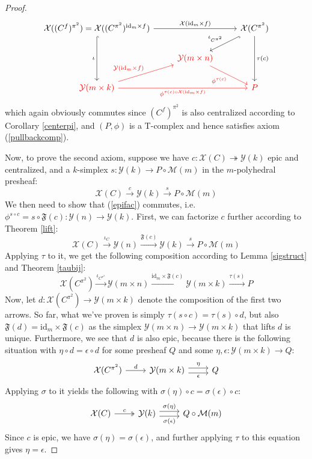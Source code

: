 \documentclass{article}
\theoremstyle{remark}
\theoremstyle{definition}
\newcommand{\id}{\mathrm{id}}
\newcommand{\Y}{\mathcal Y}
\newcommand{\X}{\mathcal X}
\newcommand{\F}{\mathfrak F}
\newcommand{\M}{\mathcal M}
\begin{document}
\begin{proof}
\[\begin{tikzcd}
			\X((C^f)^{\pi^2})=\X((C^{\pi^2})^{\id_m\times f})\arrow[hook]{dd}[swap]{\iota}\arrow{rr}{\X(\id_m\times f)}&&\X(C^{\pi^2})\arrow[hook]{ld}[swap]{\iota_{C^{\pi^2}}}\arrow{dd}{\tau(c)}\\
			&\color{red}{\Y(m\times n)}\arrow[color=red]{dr}[swap]{\phi^{\tau(c)}}\\
			\color{red}{\Y(m\times k)}\arrow[color=red]{ur}{\Y(\id_m\times f)}\arrow[color=red]{rr}[swap]{\phi^{\tau(c)\circ\X(\id_m\times f)}}&&\color{red}P
		\end{tikzcd}\]
		which again obviously commutes since $(C^f)^{\pi^2}$ is also centralized according to Corollary \ref{centerpi}, and $(P,\phi)$ is a T-complex and hence satisfies axiom (\ref{pullbackcomp}).
		
		Now, to prove the second axiom, suppose we have $c:\X(C)\twoheadrightarrow\Y(k)$ epic and centralized, and a $k$-simplex $s:\Y(k)\to P\circ\M(m)$ in the $m$-polyhedral presheaf:
		\[\X(C)\xrightarrow{c}\Y(k)\xrightarrow{s}P\circ\M(m)\]
		We then need to show that (\ref{epifac}) commutes, i.e. $\phi^{s\circ c}=s\circ\F(c):\Y(n)\to\Y(k)$. First, we can factorize $c$ further according to Theorem \ref{lift}:
		\[\X(C)\xrightarrow{\iota_C}\Y(n)\xrightarrow{\F(c)}\Y(k)\xrightarrow{s}P\circ\M(m)\]
		Applying $\tau$ to it, we get the following composition according to Lemma \ref{sigstruct} and Theorem \ref{taubij}:
		\[\X(C^{\pi^2})\xrightarrow{\iota_{C^{\pi^2}}}\Y(m\times n)\xrightarrow{\id_m\times\F(c)}\Y(m\times k)\xrightarrow{\tau(s)}P\]
		Now, let $d:\X(C^{\pi^2})\to\Y(m\times k)$ denote the composition of the first two arrows. So far, what we've proven is simply $\tau(s\circ c)=\tau(s)\circ d$, but also $\F(d)=\id_m\times\F(c)$ as the simplex $\Y(m\times n)\to\Y(m\times k)$ that lifts $d$ is unique. Furthermore, we see that $d$ is also epic, because there is the following situation with $\eta\circ d=\epsilon\circ d$ for some presheaf $Q$ and some $\eta,\epsilon:\Y(m\times k)\to Q$:
		\[\begin{tikzcd}
			\X(C^{\pi^2})\arrow{r}{d}&\Y(m\times k)\arrow[shift left=1mm]{r}{\eta}\arrow[shift right=1mm]{r}[swap]{\epsilon}&Q
		\end{tikzcd}\]
		Applying $\sigma$ to it yields the following with $\sigma(\eta)\circ c=\sigma(\epsilon)\circ c$:
		\[\begin{tikzcd}
			\X(C)\arrow[two heads]{r}{c}&\Y(k)\arrow[shift left=1mm]{r}{\sigma(\eta)}\arrow[shift right=1mm]{r}[swap]{\sigma(\epsilon)}&Q\circ\M(m)
		\end{tikzcd}\]
		Since $c$ is epic, we have $\sigma(\eta)=\sigma(\epsilon)$, and further applying $\tau$ to this equation gives $\eta=\epsilon$.
		

\end{proof}
\end{document}
